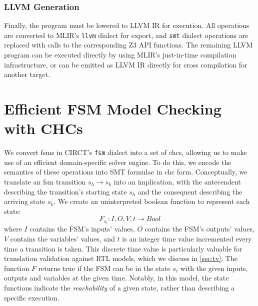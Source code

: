 \documentclass[acmsmall,screen,review]{acmart}
\begin{document}
\subsubsection{LLVM Generation}
Finally, the program must be lowered to LLVM IR for execution.
All operations are converted to MLIR's \texttt{llvm} dialect for export, and \texttt{smt} dialect operations are replaced with calls to the corresponding Z3 API functions.
The remaining LLVM program can be executed directly by \toolname{} using MLIR's just-in-time compilation infrastructure, or can be emitted as LLVM IR directly for cross compilation for another target.

\section{Efficient FSM Model Checking with CHCs}
\label{sec:smt-gen}
We convert \acp{fsm} in CIRCT's \texttt{fsm} dialect into a set of \acp{chc}, allowing us to make use of an efficient domain-specific solver engine.
To do this, we encode the semantics of these operations into SMT formulae in \ac{chc} form.
Conceptually, we translate an \ac{fsm} transition $s_h \rightarrow s_k$ into an implication, with the antecendent describing the transition's starting state $s_h$ and the consequent describing the arriving state $s_k$. We create an uninterpreted boolean function to represent each state:
\begin{equation}
  F_{s_i}: I, O, V, t \rightarrow Bool
\end{equation}
where $I$ contains the FSM's inputs' values, $O$ contains the FSM's outputs' values, $V$ contains the variables' values, and $t$ is an 
integer time value incremented every time a transition is taken.
This discrete time value is particularly valuable for translation validation against RTL models, which we discuss in \autoref{sec:tv}.
The function $F$ returns true if the FSM can be in the state $s_i$ with the given inputs, outputs and variables at the given time. 
Notably, in this model, the state functions indicate the \textit{reachability} of a given state, rather than describing a specific execution.
\end{document}
